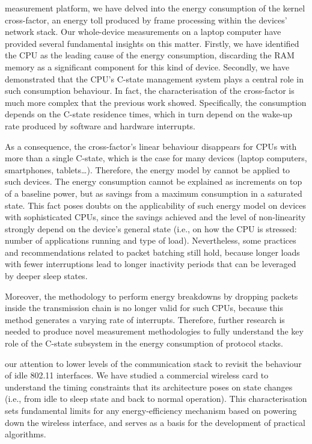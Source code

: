 \documentclass[twoside,nohyper]{tufte-book}
\begin{document}
 measurement platform, we have delved into the energy consumption of the kernel cross-factor, an energy toll produced by frame processing within the devices' network stack. Our whole-device measurements on a laptop computer have provided several fundamental insights\cite[-.9in]{contrib-04a,contrib-04b} on this matter. Firstly, we have identified the CPU as the leading cause of the energy consumption, discarding the RAM memory as a significant component for this kind of device. Secondly, we have demonstrated that the CPU's C-state management system plays a central role in such consumption behaviour. In fact, the characterisation of the cross-factor is much more complex that the previous work showed. Specifically, the consumption depends on the C-state residence times, which in turn depend on the wake-up rate produced by software and hardware interrupts.

As a consequence, the cross-factor's linear behaviour disappears for CPUs with more than a single C-state, which is the case for many devices (laptop computers, smartphones, tablets\ldots{}). Therefore, the energy model by \citet{Serrano2014} cannot be applied to such devices. The energy consumption cannot be explained as increments on top of a baseline power, but as savings from a maximum consumption in a saturated state. This fact poses doubts on the applicability of such energy model on devices with sophisticated CPUs, since the savings achieved and the level of non-linearity strongly depend on the device's general state (i.e., on how the CPU is stressed: number of applications running and type of load). Nevertheless, some practices and recommendations related to packet batching still hold, because longer loads with fewer interruptions lead to longer inactivity periods that can be leveraged by deeper sleep states.

Moreover, the methodology to perform energy breakdowns by dropping packets inside the transmission chain is no longer valid for such CPUs, because this method generates a varying rate of interrupts. Therefore, further research is needed to produce novel measurement methodologies to fully understand the key role of the C-state subsystem in the energy consumption of protocol stacks.

 our attention to lower levels of the communication stack to revisit the behaviour of idle 802.11 interfaces. We have studied a commercial wireless card to understand the timing constraints that its architecture poses on state changes (i.e., from idle to sleep state and back to normal operation). This characterisation sets fundamental limits for any energy-efficiency mechanism based on powering down the wireless interface, and serves as a basis for the development of practical algorithms.
\end{document}
